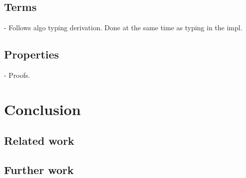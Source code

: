 \documentclass{llncs}
\begin{document}
\subsection{Terms}
- Follows algo typing derivation. Done at the same time as typing in the
impl.

\subsection{Properties}
- Proofs.

\section{Conclusion}
\subsection{Related work}

\subsection{Further work}




\renewcommand{\thefootnote}{}
\end{document}
